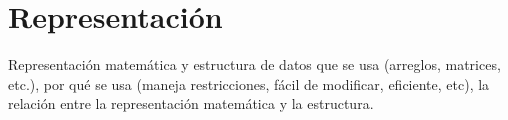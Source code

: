 \section{Representación}

Representación matemática y estructura de datos que se usa (arreglos, matrices, etc.), por qué se usa (maneja restricciones, fácil de modificar, eficiente, etc), la relación entre la representación matemática y la estructura.
